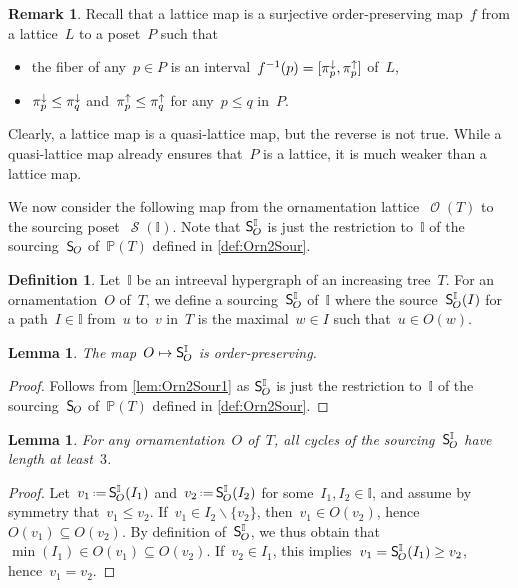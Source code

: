 \documentclass{amsart}
\newtheorem{lemma}[theorem]{Lemma}
\theoremstyle{definition}
\newtheorem{definition}[theorem]{Definition}
\newtheorem{remark}[theorem]{Remark}
\renewcommand{\c}[1]{\mathcal{#1}} %
\newcommand{\ssm}{\smallsetminus} %
\newcommand{\eqdef}{\mbox{\,\raisebox{0.2ex}{\scriptsize\ensuremath{\mathrm:}}\ensuremath{=}\,}} %
\newcommand{\projDown}[1]{\smash{\pi^\downarrow_{#1}}} %
\newcommand{\projUp}[1]{\smash{\pi^\uparrow_{#1}}} %
\newcommand{\mymap}[2]{\mathsf{#1}_{\hspace{-.7pt}#2}}
\DeclareMathOperator{\Orn}{\c{O}}  %
\DeclareMathOperator{\Sour}{\mathcal{S}}  %
\newcommand{\sour}[1]{\mymap{S}{#1}}  %
\newcommand{\II}{\mathbb I} %
\newcommand{\PP}{\mathbb P} %
\begin{document}
\begin{remark}
Recall that a lattice map is a surjective order-preserving map~$f$ from a lattice~$L$ to a poset~$P$ such that
\begin{itemize}
\item the fiber of any~$p \in P$ is an interval~$f^{-1}(p) = [\projDown{p}, \projUp{p}]$ of~$L$,
\item $\projDown{p} \le \projDown{q}$ and~$\projUp{p} \le \projUp{q}$ for any~$p \le q$ in~$P$.
\end{itemize}
Clearly, a lattice map is a quasi-lattice map, but the reverse is not true.
While a quasi-lattice map already ensures that~$P$ is a lattice, it is much weaker than a lattice map.
\end{remark}

We now consider the following map from the ornamentation lattice~$\Orn(T)$ to the sourcing poset~$\Sour(\II)$.
Note that $\sour{O}^\II$ is just the restriction to~$\II$ of the sourcing~$\sour{O}$ of~$\PP(T)$ defined in \cref{def:Orn2Sour}.

\begin{definition}
\label{def:Orn2SourIntreeval}
Let~$\II$ be an intreeval hypergraph of an increasing tree~$T$.
For an ornamentation~$O$ of~$T$, we define a sourcing~$\sour{O}^\II$ of~$\II$ where the source~$\sour{O}^\II(I)$ for a path~$I \in \II$ from~$u$ to~$v$ in~$T$ is the maximal~$w \in I$ such that~$u \in O(w)$.
\end{definition}

\begin{lemma}
\label{lem:Orn2SourIntreeval1}
The map~$O \mapsto \sour{O}^\II$ is order-preserving.
\end{lemma}

\begin{proof}
Follows from \cref{lem:Orn2Sour1} as $\sour{O}^\II$ is just the restriction to~$\II$ of the sourcing~$\sour{O}$ of~$\PP(T)$ defined in \cref{def:Orn2Sour}.
\end{proof}

\begin{lemma}
\label{lem:Orn2SourIntreeval2}
For any ornamentation~$O$ of~$T$, all cycles of the sourcing~$\sour{O}^\II$ have length at least~$3$.
\end{lemma}

\begin{proof}
Let~$v_1 \eqdef \sour{O}^\II(I_1)$ and~$v_2 \eqdef \sour{O}^\II(I_2)$ for some~$I_1,I_2 \in \II$, and assume by symmetry that~${v_1 \le v_2}$.
If~$v_1 \in I_2 \ssm \{v_2\}$, then~$v_1 \in O(v_2)$, hence~$O(v_1) \subseteq O(v_2)$.
By definition of~$\sour{O}^\II$, we thus obtain that~$\min(I_1) \in O(v_1) \subseteq O(v_2)$.
If~$v_2 \in I_1$, this implies~$v_1 = \sour{O}^\II(I_1) \ge v_2$, hence~${v_1 = v_2}$.
\end{proof}
\end{document}
